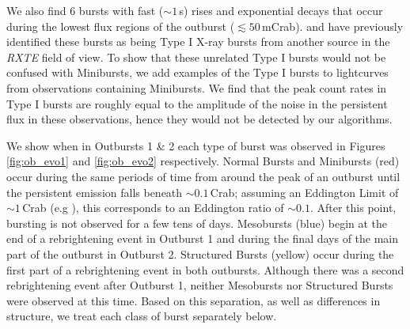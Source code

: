 \par We also find 6 bursts with fast ($\sim1$\,s) rises and exponential decays that occur during the lowest flux regions of the outburst ($\lesssim50$\,mCrab).  \citet{Strohmayer_BPFieldTypeI} and \citet{Galloway_TypeI} have previously identified these bursts as being Type I X-ray bursts from another source in the \textit{RXTE} field of view.  To show that these unrelated Type I bursts would not be confused with Minibursts, we add examples of the Type I bursts to lightcurves from observations containing Minibursts.  We find that the peak count rates in Type I bursts are roughly equal to the amplitude of the noise in the persistent flux in these observations, hence they would not be detected by our algorithms.
\par We show when in Outbursts 1 \& 2 each type of burst was observed in Figures \ref{fig:ob_evo1} and \ref{fig:ob_evo2} respectively.  Normal Bursts and Minibursts (red) occur during the same periods of time from around the peak of an outburst until the persistent emission falls beneath $\sim0.1$\,Crab; assuming an Eddington Limit of $\sim1$\,Crab (e.g \citealp{Sazonov_BPGranat}), this corresponds to an Eddington ratio of $\sim0.1$.  After this point, bursting is not observed for a few tens of days.  Mesobursts (blue) begin at the end of a rebrightening event in Outburst 1 and during the final days of the main part of the outburst in Outburst 2.  Structured Bursts (yellow) occur during the first part of a rebrightening event in both outbursts.  Although there was a second rebrightening event after Outburst 1, neither Mesobursts nor Structured Bursts were observed at this time.  Based on this separation, as well as differences in structure, we treat each class of burst separately below.


